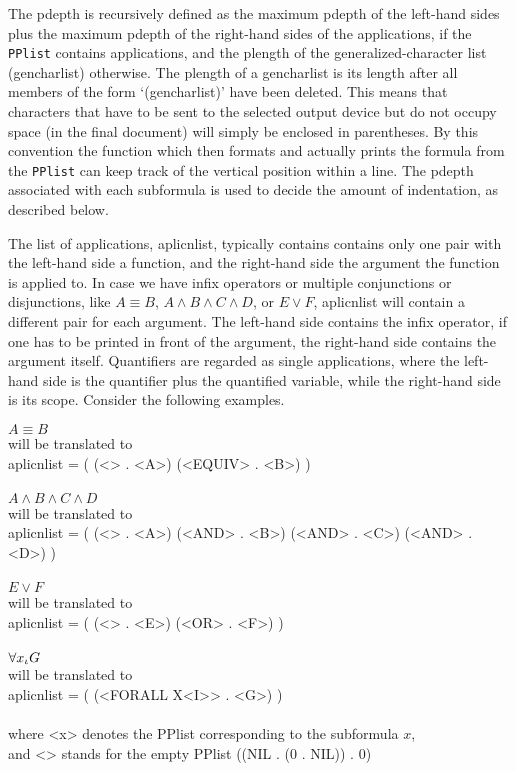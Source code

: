 The pdepth is recursively defined as the maximum pdepth of the left-hand sides
plus the maximum pdepth of the right-hand sides of the
applications, if the {\tt PPlist} contains applications, and the plength
of the generalized-character list (gencharlist) otherwise.
The plength of a gencharlist is 
its length after all members of the form
`(gencharlist)' have been deleted.  This means that characters that have to
be sent to the selected output device but do not occupy space (in the final
document) will simply be enclosed in parentheses.  By this convention
the function which then formats and actually prints the formula from the 
{\tt PPlist} can keep track of the vertical position within a line.  The 
pdepth associated with each subformula is used to decide the amount of
indentation, as described below.

The list of applications, aplicnlist, typically contains 
contains only one pair with the left-hand side
a function, and the right-hand side the argument the function is
applied to.  In case we have infix operators or multiple conjunctions
or disjunctions, like $A \equiv B$, 
$A \land B \land C \land D$, or $E \lor F$, aplicnlist will contain a 
different pair for each argument.  The left-hand side contains the
infix operator, if one has to be printed in front of the argument, the
right-hand side contains the argument itself.  Quantifiers are regarded as
single applications, where the left-hand side is the quantifier plus the
quantified variable, while the right-hand side is its scope.
Consider the following examples.
\begin{Example}
$A \equiv B$ \\
will be translated to\\
aplicnlist  =  ( (<> . <A>) (<EQUIV> . <B>) )\\
\\
$A \land B \land C \land D$\\
will be translated to \\
aplicnlist  =  ( (<> . <A>) (<AND> . <B>) (<AND> . <C>)
                 (<AND> . <D>) )\\
\\
$E \lor F$\\
will be translated to\\
aplicnlist  =  ( (<> . <E>) (<OR> . <F>) )\\
\\
$\forall x_\iota G$ \\
will be translated to \\
aplicnlist  =  ( (<FORALL X<I>> . <G>) ) \\
\\
where <x> denotes the PPlist corresponding to the subformula $x$,\\
and <> stands for the empty PPlist ((NIL . (0 . NIL)) . 0)
\end{Example}

